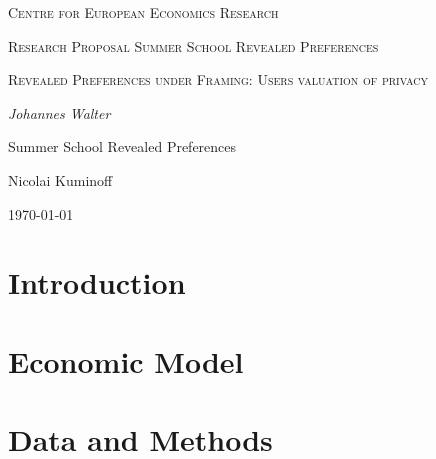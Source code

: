 \documentclass[12pt,a4paper]{article}
\author{Johannes Walter}
\begin{document}
\begin{titlepage}
    \centering
    \vspace{5cm}
    {\scshape Centre for European Economics Research \par}
    \vspace{0.5cm}
    {\scshape Research Proposal Summer School Revealed Preferences \par}
    \vspace{1.5cm}
    {\scshape\LARGE Revealed Preferences under Framing: Users valuation of privacy \par}
    \vspace{2cm}
    {\itshape Johannes Walter \par}
    \vspace{1cm}
    \begin{abstract}
    Diese Dokumentation enth"alt eine sortierte Liste der wichtigsten
    \LaTeX--Befehle. Die einzelnen Listeneintr"age sind untereinander
    durch viele Querverweise verkettet, die ein Auffinden inhaltlich
    zusammengeh"origer Informationen erheblich erleichtern.
    \end{abstract}
    \vfill
    Summer School Revealed Preferences \par 
    Nicolai Kuminoff 
    \vfill

    {\large \today\par}
\end{titlepage}


\section{Introduction}
\label{introduction}


\section{Economic Model}
\label{model}


\section{Data and Methods}
\label{data and methods}


\printbibliography
\end{document}
